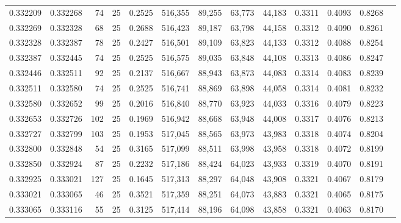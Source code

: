 \begin{tabular}{rrrrrrrrrrrrr}
0.332209 & 0.332268 &    74 &  25 &                                     0.2525 & 516,355 &  89,255 &  63,773 &  44,183 & 0.3311 & 0.4093 & 0.8268 \\
0.332269 & 0.332328 &    68 &  25 &                                     0.2688 & 516,423 &  89,187 &  63,798 &  44,158 & 0.3312 & 0.4090 & 0.8261 \\
0.332328 & 0.332387 &    78 &  25 &                                     0.2427 & 516,501 &  89,109 &  63,823 &  44,133 & 0.3312 & 0.4088 & 0.8254 \\
0.332387 & 0.332445 &    74 &  25 &                                     0.2525 & 516,575 &  89,035 &  63,848 &  44,108 & 0.3313 & 0.4086 & 0.8247 \\
0.332446 & 0.332511 &    92 &  25 &                                     0.2137 & 516,667 &  88,943 &  63,873 &  44,083 & 0.3314 & 0.4083 & 0.8239 \\
0.332511 & 0.332580 &    74 &  25 &                                     0.2525 & 516,741 &  88,869 &  63,898 &  44,058 & 0.3314 & 0.4081 & 0.8232 \\
0.332580 & 0.332652 &    99 &  25 &                                     0.2016 & 516,840 &  88,770 &  63,923 &  44,033 & 0.3316 & 0.4079 & 0.8223 \\
0.332653 & 0.332726 &   102 &  25 &                                     0.1969 & 516,942 &  88,668 &  63,948 &  44,008 & 0.3317 & 0.4076 & 0.8213 \\
0.332727 & 0.332799 &   103 &  25 &                                     0.1953 & 517,045 &  88,565 &  63,973 &  43,983 & 0.3318 & 0.4074 & 0.8204 \\
0.332800 & 0.332848 &    54 &  25 &                                     0.3165 & 517,099 &  88,511 &  63,998 &  43,958 & 0.3318 & 0.4072 & 0.8199 \\
0.332850 & 0.332924 &    87 &  25 &                                     0.2232 & 517,186 &  88,424 &  64,023 &  43,933 & 0.3319 & 0.4070 & 0.8191 \\
0.332925 & 0.333021 &   127 &  25 &                                     0.1645 & 517,313 &  88,297 &  64,048 &  43,908 & 0.3321 & 0.4067 & 0.8179 \\
0.333021 & 0.333065 &    46 &  25 &                                     0.3521 & 517,359 &  88,251 &  64,073 &  43,883 & 0.3321 & 0.4065 & 0.8175 \\
0.333065 & 0.333116 &    55 &  25 &                                     0.3125 & 517,414 &  88,196 &  64,098 &  43,858 & 0.3321 & 0.4063 & 0.8170 \\

\end{tabular}
